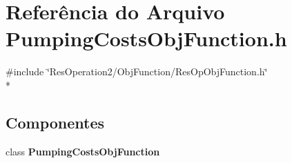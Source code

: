 \section{Referência do Arquivo Pumping\+Costs\+Obj\+Function.\+h}
\label{_2_obj_function_2_pumping_costs_2_pumping_costs_obj_function_8h}
{\ttfamily \#include \char`\"{}Res\+Operation2/\+Obj\+Function/\+Res\+Op\+Obj\+Function.\+h\char`\"{}}\\*
\subsection*{Componentes}
\begin{DoxyCompactItemize}
\item 
class {\bf Pumping\+Costs\+Obj\+Function}
\end{DoxyCompactItemize}

